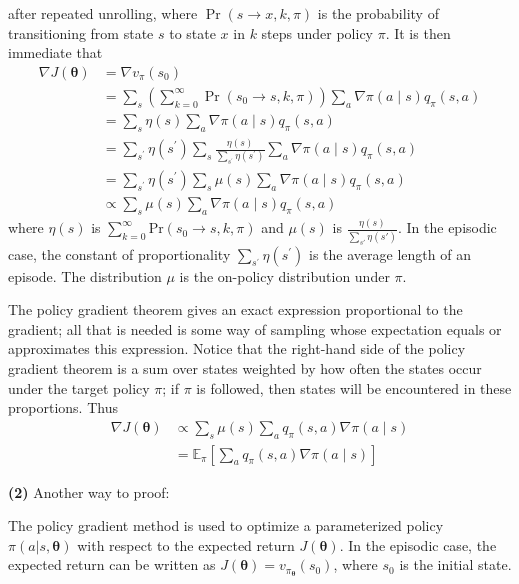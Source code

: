 \documentclass{homework}
\begin{document}
after repeated unrolling, where $\operatorname{Pr}(s \rightarrow x, k, \pi)$ is the probability of transitioning from state $s$ to state $x$ in $k$ steps under policy $\pi$. It is then immediate that
$$
\begin{aligned}
\nabla J(\boldsymbol{\theta}) & =\nabla v_{\pi}\left(s_{0}\right) \\
& =\sum_{s}\left(\sum_{k=0}^{\infty} \operatorname{Pr}\left(s_{0} \rightarrow s, k, \pi\right)\right) \sum_{a} \nabla \pi(a \mid s) q_{\pi}(s, a) \\
& =\sum_{s} \eta(s) \sum_{a} \nabla \pi(a \mid s) q_{\pi}(s, a) \\
& =\sum_{s^{\prime}} \eta\left(s^{\prime}\right) \sum_{s} \frac{\eta(s)}{\sum_{s^{\prime}} \eta\left(s^{\prime}\right)} \sum_{a} \nabla \pi(a \mid s) q_{\pi}(s, a) \\
& =\sum_{s^{\prime}} \eta\left(s^{\prime}\right) \sum_{s} \mu(s) \sum_{a} \nabla \pi(a \mid s) q_{\pi}(s, a) \\
& \propto \sum_{s} \mu(s) \sum_{a} \nabla \pi(a \mid s) q_{\pi}(s, a)
\end{aligned}
$$
where $\eta (s)$ is $\sum_{k=0}^{\infty}\mathrm{Pr}(s_{0}\rightarrow s,k,\pi)$ and $\mu(s)$ is $\frac{\eta(s)}{\sum_{s'} \eta(s')}$. In the episodic case, the constant of proportionality $\sum_{s^{\prime}} \eta\left(s^{\prime}\right)$ is the average length of an episode. The distribution $\mu$ is the on-policy distribution under $\pi$. 

The policy gradient theorem gives an exact expression proportional to the gradient; all that is needed is some way of sampling whose expectation equals or approximates this expression. Notice that the right-hand side of the policy gradient theorem is a sum over states weighted by how often the states occur under the target policy $\pi$; if $\pi$ is followed, then states will be encountered in these proportions. Thus
$$
\begin{aligned}
    \nabla J(\boldsymbol{\theta}) & \propto \sum_s \mu(s) \sum_a q_\pi(s, a) \nabla \pi(a \mid s) \\
    & =\mathbb{E}_\pi\left[\sum_a q_\pi\left(s, a\right) \nabla \pi\left(a \mid s\right)\right]
\end{aligned}
$$

\textbf{(2)} Another way to proof:

The policy gradient method is used to optimize a parameterized policy $\pi(a|s,\boldsymbol{\theta})$ with respect to the expected return $J(\boldsymbol{\theta})$. In the episodic case, the expected return can be written as $J(\boldsymbol{\theta}) = v_{\pi_{\boldsymbol{\theta}}}(s_0)$, where $s_0$ is the initial state.
\end{document}
